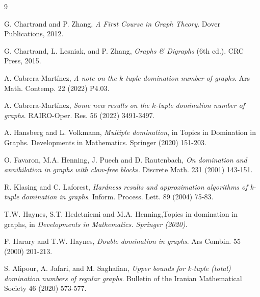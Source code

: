 \documentclass{article}
\begin{document}
\begin{thebibliography}{9}
        
        G. Chartrand and P. Zhang, \textit{A First Course in Graph Theory}. Dover Publications, 2012.

        G. Chartrand, L. Lesniak, and P. Zhang, \textit{Graphs \& Digraphs} (6th ed.). CRC Press, 2015.

        A. Cabrera-Martínez, \textit{A note on the $k$-tuple domination number of graphs}. Ars Math. Contemp. 22 (2022) P4.03.
        
        A. Cabrera-Martínez, \textit{Some new results on the $k$-tuple domination number of graphs}. RAIRO-Oper. Res. 56 (2022) 3491-3497.
        
    	A. Hansberg and L. Volkmann, \textit{Multiple domination}, in Topics in Domination in Graphs. Developments in Mathematics. Springer (2020) 151-203.

    	O. Favaron, M.A. Henning, J. Puech and D. Rautenbach, \textit{On domination and annihilation in graphs with claw-free blocks}. Discrete Math. 231 (2001) 143-151.

    	R. Klasing and C. Laforest, \textit{Hardness results and approximation algorithms of k-tuple domination in graphs}. Inform. Process. Lett. 89 (2004) 75-83.

    	T.W. Haynes, S.T. Hedetniemi and M.A. Henning,Topics in domination in graphs, in \textit{Developments in Mathematics. Springer (2020).}


    	F. Harary and T.W. Haynes, \textit{Double domination in graphs}. Ars Combin. 55 (2000) 201-213.

        S. Alipour, A. Jafari, and M. Saghafian, \textit{Upper bounds for k-tuple (total) domination numbers of regular graphs}. Bulletin of the Iranian Mathematical Society 46 (2020) 573-577.
    \end{thebibliography}

	








	


	
	
	
\end{document}
